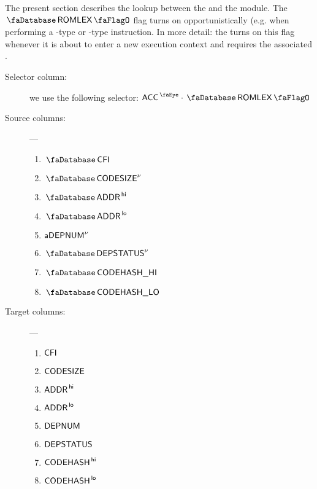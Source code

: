 The present section describes the lookup between the \hubMod{} and the \romLexMod{} module.
The $\accRomLexFlag$ flag turns on opportunistically (e.g. when performing a -type or -type instruction.
In more detail: the \zkEvm{} turns on this flag whenever it is about to enter a new execution context and requires the associated \cfi{}. 
\begin{description}
	\item[Selector column:] we use the following selector: $\peekAccount \cdot \accRomLexFlag$
	\item[Source columns:] ---
		\begin{multicols}{4}
			\begin{enumerate}
				\item $\accCfi$
				\item $\accCodesize\new$
				\item $\accAddressHi$
				\item $\accAddressLo$
				\item $\textsf{a}\textsf{DEPNUM}^{\nu}$
				\item $\accDeploymentStatus\new$
				\item $\accCodehashHi$
				\item $\accCodehashLo$
			\end{enumerate}
		\end{multicols}
	\item[Target columns:] ---
		\begin{multicols}{4}
			\begin{enumerate}
				\item $\textsf{CFI}$
				\item $\textsf{CODESIZE}$
				\item $\textsf{ADDR}^{\mathsf{\,hi}}$
				\item $\textsf{ADDR}^{\mathsf{\,lo}}$
				\item $\textsf{DEPNUM}$
				\item $\textsf{DEPSTATUS}$
				\item $\textsf{CODEHASH}^{\mathsf{\,hi}}$
				\item $\textsf{CODEHASH}^{\mathsf{\,lo}}$
			\end{enumerate}
		\end{multicols}
\end{description}
